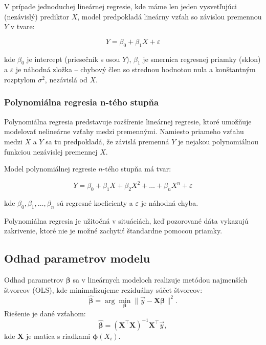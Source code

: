 V prípade jednoduchej lineárnej regresie, kde máme len jeden vysvetľujúci (nezávislý) prediktor $X$, model predpokladá lineárny vzťah so závislou premennou $Y$ v tvare:

\begin{equation}
Y = \beta_0 + \beta_1 X + \varepsilon
\end{equation}

kde $\beta_0$ je intercept (priesečník s osou $Y$), $\beta_1$ je smernica regresnej priamky (sklon) a $\varepsilon$ je náhodná zložka – chybový člen so strednou hodnotou nula a konštantným rozptylom $\sigma^2$, nezávislá od $X$.

\subsubsection{Polynomiálna regresia n-tého stupňa}
\label{subsec:polynomial_regression}

Polynomiálna regresia predstavuje rozšírenie lineárnej regresie, ktoré umožňuje modelovať nelineárne vzťahy medzi premennými. Namiesto priameho vzťahu medzi $X$ a $Y$ sa tu predpokladá, že závislá premenná $Y$ je nejakou polynomiálnou funkciou nezávislej premennej $X$.

Model polynomiálnej regresie $n$-tého stupňa má tvar:

\begin{equation}
Y = \beta_0 + \beta_1 X + \beta_2 X^2 + \dots + \beta_n X^n + \varepsilon
\end{equation}

kde $\beta_0, \beta_1, \dots, \beta_n$ sú regresné koeficienty a $\varepsilon$ je náhodná chyba.

Polynomiálna regresia je užitočná v situáciách, keď pozorované dáta vykazujú zakrivenie, ktoré nie je možné zachytiť štandardne pomocou priamky.

\subsection{Odhad parametrov modelu}\label{subsec:odhad_parametrov_modelu}

Odhad parametrov $\boldsymbol{\beta}$ sa v lineárnych modeloch realizuje metódou najmenších štvorcov (OLS), kde minimalizujeme reziduálny súčet štvorcov:
\begin{equation}
\hat{\boldsymbol{\beta}} = \arg\min_{\boldsymbol{\beta}} \| \vec{y} - \mathbf{X} \boldsymbol{\beta} \|^2.
\end{equation}
Riešenie je dané vzťahom:
\begin{equation}
\hat{\boldsymbol{\beta}} = (\mathbf{X}^\top \mathbf{X})^{-1} \mathbf{X}^\top \vec{y},
\end{equation}
kde $\mathbf{X}$ je matica s riadkami $\boldsymbol{\phi}(X_i)$.

